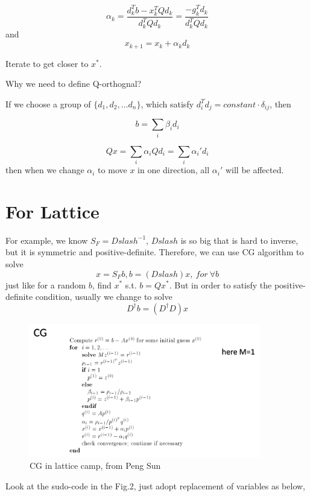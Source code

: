 \documentclass[11pt]{article} %
\begin{document}
\[ \alpha_k = \frac{d_k^T b - x_k^T Q d_k}{d_k^T Q d_k} = \frac{-g_k^T d_k}{d_k^T Q d_k} \]
and
\[ x_{k+1} = x_k + \alpha_k d_k \]

Iterate to get closer to $x^*$.

\begin{center}
    Why we need to define Q-orthognal?
\end{center}
If we choose a group of $\{d_1, d_2, \dots d_n\}$, which satisfy $d_i^T d_j = constant \cdot \delta_{ij}$, then

\[ b = \sum_i \beta_i d_i \]

\[ Qx = \sum_i \alpha_i Q d_i = \sum_i \alpha_i' d_i \]
then when we change $\alpha_i$ to move $x$ in one direction, all $\alpha_i'$ will be affected.

\section{For Lattice}

\noindent

For example, we know $S_F = Dslash^{-1}$, $Dslash$ is so big that is hard to inverse, but it is symmetric and positive-definite. Therefore, we can use CG algorithm to solve 
\[ x = S_F b, b = (Dslash) x ,\ for\ \forall b \]
just like for a random $b$, find $x^*$ s.t. $b=Q x^*$. But in order to satisfy the positive-definite condition, usually we change to solve
\[ D^{\dagger}b = (D^{\dagger}D) x \]

\begin{figure}[!th]
\begin{center}
\includegraphics[width=0.9\textwidth]{fig2.png}
\caption{CG in lattice camp, from Peng Sun}
\end{center}
\end{figure}

Look at the sudo-code in the Fig.2, just adopt replacement of variables as below,
\end{document}
